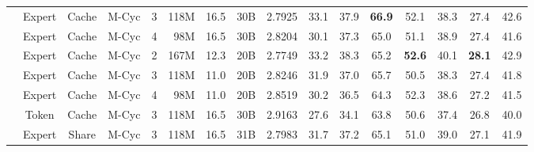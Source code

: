 \begin{table}[!t]
{\begin{tabular}{l|cc|cc|ccc|c|cccccc|c}
    \rowcolor[gray]{0.9}
     \cellcolor{white}& Expert & Cache & M-Cyc & 3& 118M & 16.5 & 30B  & 2.7925 & 33.1 & 37.9 & \textbf{66.9} & 52.1 & 38.3 & 27.4 & 42.6 \\
     \rowcolor[gray]{0.9}
     \cellcolor{white}& Expert & Cache & M-Cyc & 4 & \,\,\,98M & 16.5 & 30B & 2.8204 & 30.1 & 37.3 & 65.0 & 51.1 & 38.9 & 27.4 & 41.6 \\
     \cmidrule(l{2pt}r{2pt}){2-16} 
     \rowcolor[gray]{0.9}
     \cellcolor{white}& Expert & Cache  & M-Cyc  & 2 & 167M & 12.3 & 20B & {2.7749} & {33.2} & {38.3} & 65.2 & \textbf{52.6} & 40.1 & \textbf{28.1} & {42.9} \\
      \cellcolor{white}& Expert & Cache & M-Cyc & 3& 118M & 11.0 & 20B  & 2.8246 & 31.9 & 37.0 & 65.7 & 50.5 & 38.3 & 27.4 & 41.8 \\
      \cellcolor{white}& Expert & Cache & M-Cyc & 4 & \,\,\,98M & 11.0 & 20B & 2.8519 & 30.2 & 36.5 & 64.3 & 52.3 & 38.6 & 27.2 & 41.5 \\
     \cmidrule(l{2pt}r{2pt}){2-16} 
     \cellcolor{white}& Token & Cache & M-Cyc & 3& 118M & 16.5  & 30B & 2.9163 & 27.6 & 34.1 & 63.8 & 50.6 & 37.4 & 26.8 & 40.0 \\
     \cmidrule(l{2pt}r{2pt}){2-16} 
     \cellcolor{white}\multirow{-9}{*}{MoR\,(ours)}
     & Expert & Share & M-Cyc & 3 & 118M & 16.5 & 31B & 2.7983 & 31.7 & 37.2 & 65.1 & 51.0 & 39.0 & 27.1  & 41.9 \\
    \bottomrule
    \end{tabular}
    }
    \vspace{-1pt}
\end{table}
